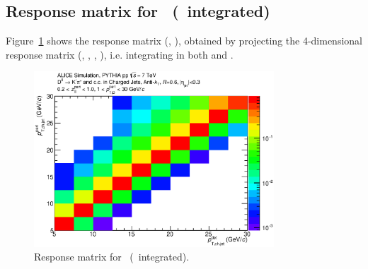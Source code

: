 \subsection{Response matrix for \ptchjet\ (\zpar\ integrated)}
Figure~\ref{fig:D0_Full_R060_ResponseMatrix_JetPt_Z_20_100_DPt_01_30_Norm} shows the response matrix (\ptchjetgen, \ptchjetdet), obtained by
projecting the 4-dimensional response matrix (\zpargen, \ptchjetgen, \zpardet, \ptchjetdet), i.e. integrating in both \zpargen and \zpardet.
\begin{figure}[tbh]
\begin{center}
\includegraphics[width=0.8\textwidth]{img/D0_Full_R060_ResponseMatrix_JetPt_Z_20_100_DPt_01_30_Norm}
 \caption{Response matrix for \ptchjet\ (\zpar\ integrated).} 
 \label{fig:D0_Full_R060_ResponseMatrix_JetPt_Z_20_100_DPt_01_30_Norm}
\end{center}
\end{figure}
